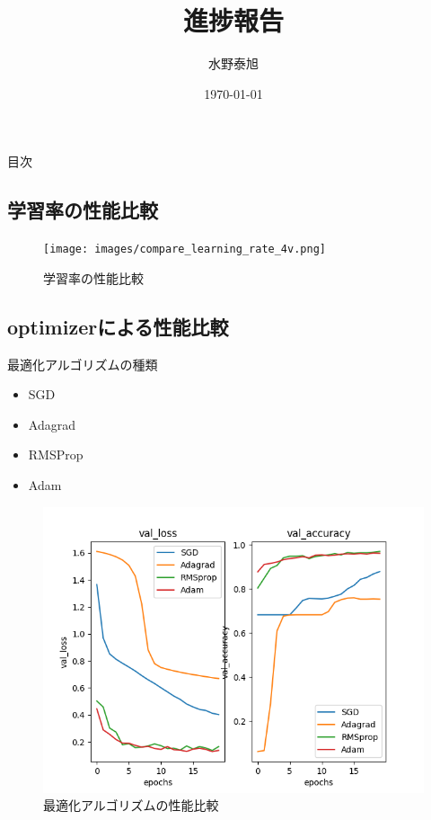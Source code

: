 \documentclass[dvipdfmx]{beamer}
\title{進捗報告}
\date{\today}
\author{水野泰旭}
\institute{弘前大学理工学部電子情報工学科４年}
\begin{document}
  \maketitle

  \begin{frame}{目次}
    \tableofcontents
   \end{frame}

  \begin{frame}
    \section{学習率の性能比較}
  \end{frame} 
  
  \begin{frame}
    \begin{figure}
      \centering
      \texttt{[image: images/compare\_learning\_rate\_4v.png]}
      \caption{学習率の性能比較}
      \label{fig:compare_lr}
    \end{figure}
  \end{frame}

  \begin{frame}
    \section{optimizerによる性能比較}
  \end{frame}

  \begin{frame}{最適化アルゴリズムの種類}
    \begin{itemize}
      \item SGD
      \item Adagrad
      \item RMSProp
      \item Adam
    \end{itemize}
  \end{frame}

  \begin{frame}
    \begin{figure}
      \centering
      \includegraphics[keepaspectratio, scale=0.6]{images/compare_learning_rate_optimizer.png}
      \caption{最適化アルゴリズムの性能比較}
    \end{figure}
  \end{frame}
\end{document}

